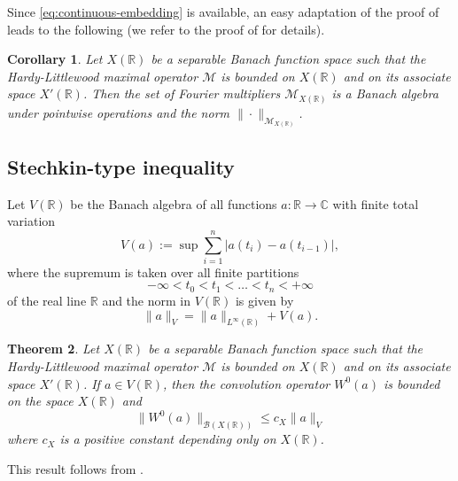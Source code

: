 \documentclass{birkjour}
\newtheorem{theorem}{Theorem}[section]
\newtheorem{corollary}[theorem]{Corollary}
\numberwithin{equation}{section}
\newcommand{\C}{\mathbb{C}}
\newcommand{\R}{\mathbb{R}}
\newcommand{\cB}{\mathcal{B}}
\newcommand{\cM}{\mathcal{M}}
\begin{document}
Since \eqref{eq:continuous-embedding} is available, an easy adaptation of
the proof of \cite[Proposition~2.5.13]{G14} leads to the following
(we refer to the proof of \cite[Corollary~1]{K15b} for details).
\begin{corollary}
Let $X(\R)$ be a separable Banach function space such that the
Hardy-Littlewood maximal operator $\cM$ is bounded on $X(\R)$ and on its
associate space $X'(\R)$. Then the set of Fourier multipliers
$\cM_{X(\R)}$ is a Banach algebra under pointwise operations and the norm
$\|\cdot\|_{\cM_{X(\R)}}$.
\end{corollary}
\subsection{Stechkin-type inequality}
Let $V(\R)$ be the Banach algebra of all functions $a:\R\to\C$ with finite
total variation
\[
V(a):=\sup\sum_{i=1}^n|a(t_i)-a(t_{i-1})|,
\]
where the supremum is taken over all finite partitions
\[
-\infty<t_0<t_1<\dots<t_n<+\infty
\]
of the real line $\R$ and the norm in $V(\R)$ is given by
\[
\|a\|_{V}=\|a\|_{L^\infty(\R)}+V(a).
\]
\begin{theorem}\label{th:Stechkin}
Let $X(\R)$ be a separable Banach function space such that the
Hardy-Littlewood maximal operator $\cM$ is bounded on $X(\R)$ and on its
associate space $X'(\R)$. If $a\in V(\R)$, then the convolution operator
$W^0(a)$ is bounded on the space $X(\R)$ and
\begin{equation}\label{eq:Stechkin}
\|W^0(a)\|_{\cB(X(\R))}
\le
c_{X}\|a\|_V
\end{equation}
where $c_{X}$ is a positive constant depending only on $X(\R)$.
\end{theorem}
This result follows from \cite[Theorem~4.3]{K15a}.
\end{document}
